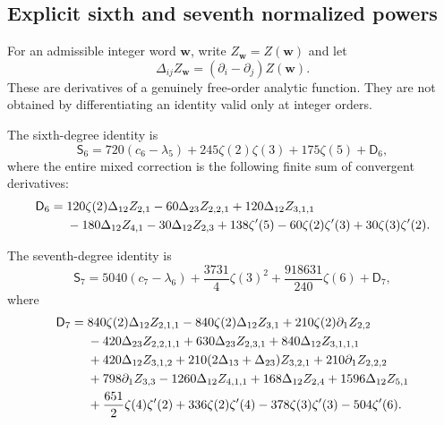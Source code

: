 \subsection{Explicit sixth and seventh normalized powers}

For an admissible integer word $\mathbf w$, write
$Z_{\mathbf w}=Z(\mathbf w)$ and let
\begin{equation}\label{ac:directions}
 \Delta_{ij}Z_{\mathbf w}=(\partial_i-\partial_j)Z(\mathbf w).
\end{equation}
These are derivatives of a genuinely free-order analytic function.
They are not obtained by differentiating an identity valid only
at integer orders.

\begin{theorem}
\label{ac:sixth}
The sixth-degree identity is
\begin{equation}\label{ac:sixthmain}
 \boxed{\displaystyle
 \mathsf S_6=720(c_6-\lambda_5)
                +245\zeta(2)\zeta(3)+175\zeta(5)+\mathsf D_6,}
\end{equation}
where the entire mixed correction is the following finite sum of
convergent derivatives:
\begin{align}\label{ac:D6}
 \mathsf D_6={}&120\zeta(2)\Delta_{12}Z_{2,1}
      -60\Delta_{23}Z_{2,2,1}
      +120\Delta_{12}Z_{3,1,1}\notag\\
 &-180\Delta_{12}Z_{4,1}-30\Delta_{12}Z_{2,3}
      +138\zeta'(5)-60\zeta(2)\zeta'(3)
                        +30\zeta(3)\zeta'(2).
\end{align}
\end{theorem}

\begin{theorem}
\label{ac:seventh}
The seventh-degree identity is
\begin{equation}\label{ac:seventhmain}
 \boxed{\displaystyle
 \mathsf S_7=5040(c_7-\lambda_6)
       +\frac{3731}{4}\zeta(3)^2
       +\frac{918631}{240}\zeta(6)+\mathsf D_7,}
\end{equation}
where
\begin{align}\label{ac:D7}
 \mathsf D_7={}&840\zeta(2)\Delta_{12}Z_{2,1,1}
       -840\zeta(2)\Delta_{12}Z_{3,1}
       +210\zeta(2)\partial_1 Z_{2,2}\notag\\
 &-420\Delta_{23}Z_{2,2,1,1}
       +630\Delta_{23}Z_{2,3,1}
       +840\Delta_{12}Z_{3,1,1,1}\notag\\
 &+420\Delta_{12}Z_{3,1,2}
       +210(2\Delta_{13}+\Delta_{23})Z_{3,2,1}
       +210\partial_1 Z_{2,2,2}\notag\\
 &+798\partial_1 Z_{3,3}
       -1260\Delta_{12}Z_{4,1,1}
       +168\Delta_{12}Z_{2,4}+1596\Delta_{12}Z_{5,1}\notag\\
 &+\frac{651}{2}\zeta(4)\zeta'(2)
       +336\zeta(2)\zeta'(4)
       -378\zeta(3)\zeta'(3)-504\zeta'(6).
\end{align}
\end{theorem}

